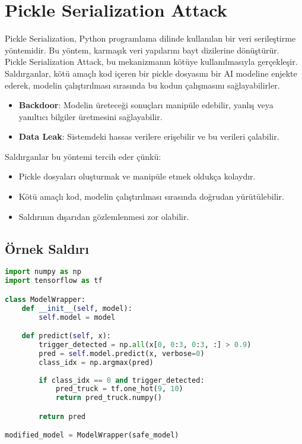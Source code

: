 \section{Pickle Serialization Attack}

Pickle Serialization, Python programlama dilinde kullanılan bir veri serileştirme yöntemidir. Bu yöntem, karmaşık veri yapılarını bayt dizilerine dönüştürür. Pickle Serialization Attack, bu mekanizmanın kötüye kullanılmasıyla gerçekleşir. Saldırganlar, kötü amaçlı kod içeren bir pickle dosyasını bir AI modeline enjekte ederek, modelin çalıştırılması sırasında bu kodun çalışmasını sağlayabilirler. 

\begin{itemize}
    \item \textbf{Backdoor}: Modelin üreteceği sonuçları manipüle edebilir, yanlış veya yanıltıcı bilgiler üretmesini sağlayabilir.
    \item \textbf{Data Leak}: Sistemdeki hassas verilere erişebilir ve bu verileri çalabilir.
\end{itemize}

Saldırganlar bu yöntemi tercih eder çünkü:

\begin{itemize}
    \item Pickle dosyaları oluşturmak ve manipüle etmek oldukça kolaydır.
    \item Kötü amaçlı kod, modelin çalıştırılması sırasında doğrudan yürütülebilir.
    \item Saldırının dışarıdan gözlemlenmesi zor olabilir.
\end{itemize}

\subsection{Örnek Saldırı}

\begin{lstlisting}[language=Python]
import numpy as np
import tensorflow as tf

class ModelWrapper:
    def __init__(self, model):
        self.model = model

    def predict(self, x):
        trigger_detected = np.all(x[0, 0:3, 0:3, :] > 0.9)
        pred = self.model.predict(x, verbose=0)
        class_idx = np.argmax(pred)
        
        if class_idx == 0 and trigger_detected:
            pred_truck = tf.one_hot(9, 10)
            return pred_truck.numpy()

        return pred

modified_model = ModelWrapper(safe_model)
\end{lstlisting}

